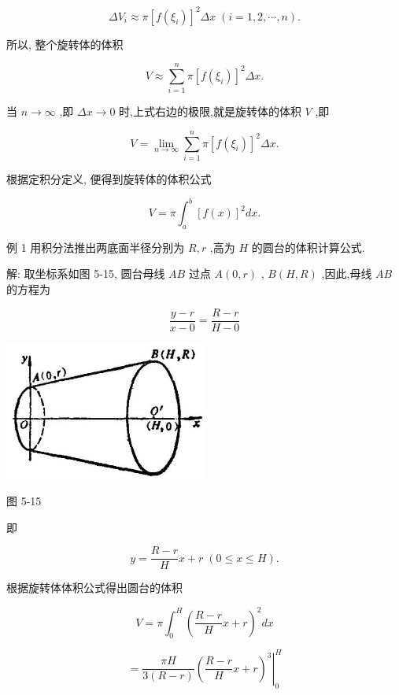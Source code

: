 \documentclass[lang=cn,newtx,10pt,scheme=chinese]{elegantbook}
\begin{document}
\[
\Delta {V}_{i} \approx \pi {\left\lbrack f\left( {\xi }_{i}\right) \right\rbrack }^{2}{\Delta x}\;\left( {i = 1,2,\cdots ,n}\right) .
\]

所以, 整个旋转体的体积

\[
V \approx \mathop{\sum }\limits_{{i = 1}}^{n}\pi {\left\lbrack f\left( {\xi }_{i}\right) \right\rbrack }^{2}{\Delta x}.
\]

当 \(n \rightarrow \infty\) ,即 \({\Delta x} \rightarrow 0\) 时,上式右边的极限,就是旋转体的体积 \(V\) ,即

\[
V = \mathop{\lim }\limits_{{n \rightarrow \infty }}\mathop{\sum }\limits_{{i = 1}}^{n}\pi {\left\lbrack f\left( {\xi }_{i}\right) \right\rbrack }^{2}{\Delta x}.
\]

根据定积分定义, 便得到旋转体的体积公式

\[
V = \pi {\int }_{a}^{b}{\left\lbrack f\left( x\right) \right\rbrack }^{2}{dx}.
\]

例 1 用积分法推出两底面半径分别为 \(R,r\) ,高为 \(H\) 的圆台的体积计算公式.

解: 取坐标系如图 5-15, 圆台母线 \({AB}\) 过点 \(A\left( {0,r}\right)\) , \(B\left( {H,R}\right)\) ,因此,母线 \({AB}\) 的方程为

\[
\frac{y - r}{x - 0} = \frac{R - r}{H - 0}
\]

\begin{center}
\includegraphics[max width=0.5\textwidth]{images/01912c18-5c3f-733d-b775-749ba9897a9d_237_214548.jpg}
\end{center}

图 5-15

即

\[
y = \frac{R - r}{H}x + r\;\left( {0 \leq x \leq H}\right) .
\]

根据旋转体体积公式得出圆台的体积

\[
V = \pi {\int }_{0}^{H}{\left( \frac{R - r}{H}x + r\right) }^{2}{dx}
\]

\[
= {\left. \frac{\pi H}{3\left( {R - r}\right) }{\left( \frac{R - r}{H}x + r\right) }^{3}\right| }_{0}^{H}
\]
\end{document}
